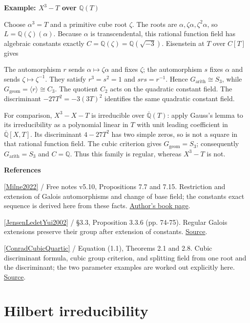 \documentclass[11pt,a4paper,oneside,openany]{book}
\newcommand{\atlasdisplay}[1]{\par\begingroup\centering\vspace{3pt}\noindent\adjustbox{max width=\linewidth}{\(\displaystyle #1\)}\par\vspace{5pt}\endgroup}
\newenvironment{sources}{\par\smallskip\begingroup\footnotesize\color{atlasgray}\leftskip=10pt\setlength{\parskip}{2pt}}{\par\endgroup\smallskip}
\begin{document}
\begin{atlasblock}[standard]
\textbf{\sffamily Example: \(X^3-T\) over \(\mathbb Q(T)\)}\par\smallskip
\color{black} Choose \(\alpha^3=T\) and a primitive cube root \(\zeta\). The roots are \(\alpha,\zeta\alpha,\zeta^2\alpha\), so \(L=\mathbb Q(\zeta)(\alpha)\). Because \(\alpha\) is transcendental, this rational function field has algebraic constants exactly \(C=\mathbb Q(\zeta)=\mathbb Q(\sqrt{-3})\). Eisenstein at \(T\) over \(C[T]\) gives\par

\atlasdisplay{[L:\mathbb Q(T)]=[L:C(T)]\,[C(T):\mathbb Q(T)]=3\cdot2=6.}
\color{black} The automorphism \(r\) sends \(\alpha\mapsto\zeta\alpha\) and fixes \(\zeta\); the automorphism \(s\) fixes \(\alpha\) and sends \(\zeta\mapsto\zeta^{-1}\). They satisfy \(r^3=s^2=1\) and \(srs=r^{-1}\). Hence \(G_{\mathrm{arith}}\cong S_3\), while \(G_{\mathrm{geom}}=\langle r\rangle\cong C_3\). The quotient \(C_2\) acts on the quadratic constant field. The discriminant \(-27T^2=-3(3T)^2\) identifies the same quadratic constant field.\par
\end{atlasblock}\color{black}
\color{black} For comparison, \(X^3-X-T\) is irreducible over \(\overline{\mathbb Q}(T)\): apply Gauss's lemma to its irreducibility as a polynomial linear in \(T\) with unit leading coefficient in \(\overline{\mathbb Q}[X,T]\). Its discriminant \(4-27T^2\) has two simple zeros, so is not a square in that rational function field. The cubic criterion gives \(G_{\mathrm{geom}}=S_3\); consequently \(G_{\mathrm{arith}}=S_3\) and \(C=\mathbb Q\). Thus this family is regular, whereas \(X^3-T\) is not.\par
\begin{sources}
\textbf{References}\par\smallskip
\noindent\hyperlink{ref:Milne2022}{[Milne2022]} / Free notes v5.10, Propositions 7.7 and 7.15. Restriction and extension of Galois automorphisms and change of base field; the constants exact sequence is derived here from these facts. \href{https://www.jmilne.org/math/Books/index.html}{Author's book page}.\par
\noindent\hyperlink{ref:JensenLedetYui2002}{[JensenLedetYui2002]} / §3.3, Proposition 3.3.6 (pp. 74-75). Regular Galois extensions preserve their group after extension of constants. \href{https://library.slmath.org/books/Book45/index.html}{Source}.\par
\noindent\hyperlink{ref:ConradCubicQuartic}{[ConradCubicQuartic]} / Equation (1.1), Theorems 2.1 and 2.8. Cubic discriminant formula, cubic group criterion, and splitting field from one root and the discriminant; the two parameter examples are worked out explicitly here. \href{https://kconrad.math.uconn.edu/blurbs/galoistheory/cubicquartic.pdf}{Source}.\par
\end{sources}\color{black}
\section{Hilbert irreducibility}
\end{document}

